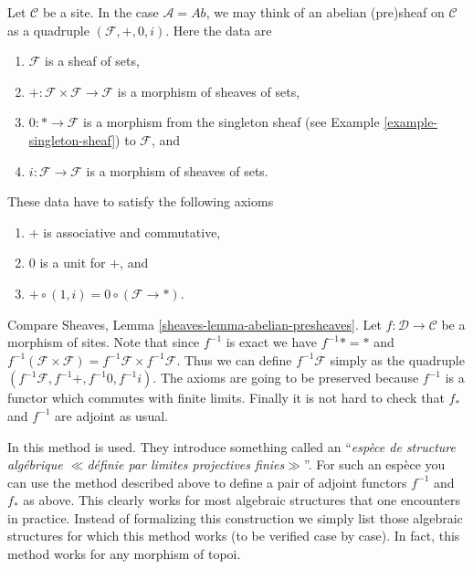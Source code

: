\medskip\noindent
Let $\mathcal{C}$ be a site.
In the case $\mathcal{A} = \textit{Ab}$,
we may think of an abelian (pre)sheaf on $\mathcal{C}$
as a quadruple $(\mathcal{F}, +, 0, i)$.
Here the data are
\begin{enumerate}
\item[(D1)] $\mathcal{F}$ is a sheaf of sets,
\item[(D2)] $+ : \mathcal{F} \times \mathcal{F} \to \mathcal{F}$ is
a morphism of sheaves of sets,
\item[(D3)] $0 : * \to \mathcal{F}$ is a morphism from the
singleton sheaf (see Example \ref{example-singleton-sheaf})
to $\mathcal{F}$, and
\item[(D4)] $i : \mathcal{F} \to \mathcal{F}$ is a morphism of sheaves
of sets.
\end{enumerate}
These data have to satisfy the following axioms
\begin{enumerate}
\item[(A1)] $+$ is associative and commutative,
\item[(A2)] $0$ is a unit for $+$, and
\item[(A3)] $+ \circ (1, i) = 0 \circ (\mathcal{F} \to *)$.
\end{enumerate}
Compare Sheaves, Lemma \ref{sheaves-lemma-abelian-presheaves}.
Let $f : \mathcal{D} \to \mathcal{C}$ be a morphism of sites.
Note that since $f^{-1}$ is exact we have
$f^{-1}* = *$ and
$f^{-1}(\mathcal{F} \times \mathcal{F}) =
f^{-1}\mathcal{F} \times f^{-1}\mathcal{F}$.
Thus we can define $f^{-1}\mathcal{F}$ simply as the quadruple
$(f^{-1}\mathcal{F}, f^{-1}+, f^{-1}0, f^{-1}i)$. The axioms
are going to be preserved because $f^{-1}$ is a functor
which commutes with finite limits. Finally it is not hard
to check that $f_*$ and $f^{-1}$ are adjoint as usual.

\medskip\noindent
In \cite{SGA4} this method is used. They introduce something
called an ``{\it esp\`ece de structure alg\'ebrique $\ll$d\'efinie
par limites projectives finies$\gg$}''. For such an esp\`ece you
can use the method described above to define a pair of adjoint
functors $f^{-1}$ and $f_*$ as above. This clearly works for most
algebraic structures that one encounters in practice.
Instead of formalizing this construction we simply list those
algebraic structures for which this method works (to be
verified case by case). In fact, this method works for any
morphism of topoi.


